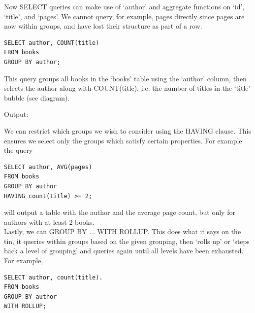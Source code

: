 \documentclass[8pt]{extarticle}
\begin{document}
\begin{multicols}{4}
Now SELECT queries can make use of `author' and aggregate functions on `id', `title', and `pages'. We cannot query, for example, pages directly since pages are now within groups, and have lost their structure as part of a row.

\vspace{0.5ex}
\begin{lstlisting}[style=sql]
SELECT author, COUNT(title)
FROM books
GROUP BY author;
\end{lstlisting}
\vspace{0.5ex}

This query groups all books in the `books' table using the `author' column, then selects the author along with COUNT(title), i.e. the number of titles in the `title' bubble (see diagram).
\vspace{1ex}

Output:
\begin{center}
\end{center}
\vspace*{1.5ex}

We can restrict which groups we wish to consider using the HAVING clause. This ensures we select only the groups which satisfy certain properties. For example the query

\vspace{0.5ex}
\begin{lstlisting}[style=sql]
SELECT author, AVG(pages)
FROM books
GROUP BY author
HAVING count(title) >= 2;
\end{lstlisting}
\vspace{0.5ex}

will output a table with the author and the average page count, but only for authors with at least $2$ books. \\

Lastly, we can GROUP BY ... WITH ROLLUP. This does what it says on the tin, it queries within groups based on the given grouping, then `rolls up' or `steps back a level of grouping' and queries again until all levels have been exhausted. For example,

\vspace{0.5ex}
\begin{lstlisting}[style=sql]
SELECT author, count(title).
FROM books
GROUP BY author
WITH ROLLUP;
\end{lstlisting}


\end{multicols}
\end{document}
